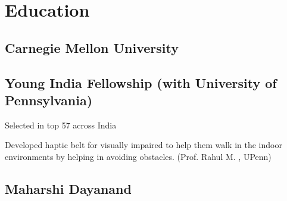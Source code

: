 \documentclass[]{resume-openfont}
\begin{document}
%
%
\lastupdated

%
%



%
%

\begin{minipage}[t]{0.36\textwidth} 


\section{Education} 

\subsection{Carnegie Mellon University}
\sectionsep

\subsection{Young India Fellowship (with University of Pennsylvania)}
\begin{tightemize}
\vspace{\topsep} %
\item Selected in top 57 across India \\
\item Developed haptic belt for visually impaired to help them walk in the indoor environments by helping in avoiding obstacles. (Prof. Rahul M. , UPenn)
\end{tightemize}
\sectionsep

\subsection{Maharshi Dayanand} 

\end{minipage}
\end{document}
